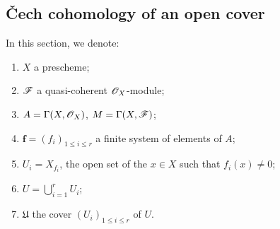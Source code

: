 \subsection{\v Cech cohomology of an open cover}
\label{subsection:3.1.2}

\begin{notation}[1.2.1]
\label{3.1.2.1}
In this section, we denote:
\begin{enumerate}
  \item $X$ a prescheme;
  \item $\mathscr{F}$ a quasi-coherent $\mathscr{O}_X$-module;
  \item $A=\Gamma(X,\mathscr{O}_X)$, $M=\Gamma(X,\mathscr{F})$;
  \item $\mathbf{f}=(f_i)_{1\leq i\leq r}$ a finite system of elements of $A$;
  \item $U_i=X_{f_i}$, the open set  of the $x\in X$ such that $f_i(x)\neq 0$;
  \item $U=\bigcup_{i=1}^r U_i$;
  \item $\mathfrak{U}$ the cover $(U_i)_{1\leq i\leq r}$ of $U$.
\end{enumerate}
\end{notation}

